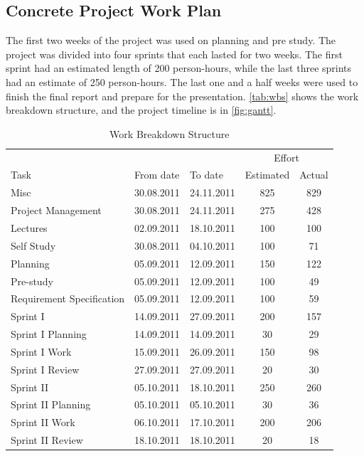\subsection{Concrete Project Work Plan}
The first two weeks of the project was used on planning and pre study.
The project was divided into four sprints that each lasted for two weeks.
The first sprint had an estimated length of 200 person-hours, while the last three
sprints had an estimate of 250 person-hours. The last one and a half weeks were used to finish
the final report and prepare for the presentation. \autoref{tab:wbs} shows the
work breakdown structure, and the project timeline is in \autoref{fig:gantt}.

\begin{table}[!htb] \footnotesize \center
\caption{Work Breakdown Structure\label{tab:wbs}}
\begin{tabular}{l l l c c}
	\toprule
	& & & \multicolumn{2}{c}{Effort} \\
	\cmidrule(r){4-5}
	Task & From date & To date & Estimated & Actual  \\
	\midrule
	Misc & 30.08.2011 & 24.11.2011 & 825 & 829  \\
	\midrule
	Project Management & 30.08.2011 & 24.11.2011 & 275 & 428 \\
	Lectures & 02.09.2011 & 18.10.2011 & 100 & 100 \\
	Self Study & 30.08.2011 & 04.10.2011 & 100 & 71 \\
	Planning & 05.09.2011 & 12.09.2011 & 150 & 122 \\
	Pre-study & 05.09.2011 & 12.09.2011 & 100 & 49 \\
	Requirement Specification & 05.09.2011 & 12.09.2011 & 100 & 59 \\
	\midrule
	Sprint I & 14.09.2011 & 27.09.2011 & 200 & 157 \\
	\midrule
	Sprint I Planning & 14.09.2011 & 14.09.2011 & 30 & 29 \\
	Sprint I Work & 15.09.2011 & 26.09.2011 & 150 & 98 \\
	Sprint I Review & 27.09.2011 & 27.09.2011 & 20 & 30 \\
	\midrule
	Sprint II & 05.10.2011 & 18.10.2011 & 250 & 260 \\
	\midrule
	Sprint II Planning & 05.10.2011 & 05.10.2011 & 30 & 36 \\
	Sprint II Work & 06.10.2011 & 17.10.2011 & 200 & 206 \\
	Sprint II Review & 18.10.2011 & 18.10.2011 & 20 & 18 \\

\end{tabular}
\end{table}
